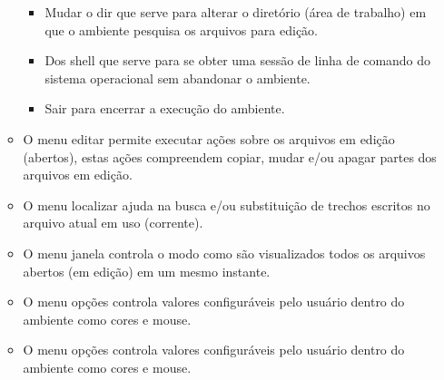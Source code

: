 \begin{enumerate}
\begin{itemize}
\begin{itemize}

  \item Mudar o dir que serve para alterar o diretório (área de trabalho) em que
  o ambiente pesquisa os arquivos para edição.

  \item Dos shell que serve para se obter uma sessão de linha de comando do
  sistema operacional sem abandonar o ambiente.

  \item Sair para encerrar a execução do ambiente.

\end{itemize}

  \item O menu editar permite executar ações sobre os arquivos em edição
  (abertos), estas ações compreendem copiar, mudar e/ou apagar partes dos
  arquivos em edição.

  \item O menu localizar ajuda na busca e/ou substituição de trechos escritos no
  arquivo atual em uso (corrente).

  \item O menu janela controla o modo como são visualizados todos os arquivos
  abertos (em edição) em um mesmo instante.

  \item O menu opções controla valores configuráveis pelo usuário dentro do
  ambiente como cores e mouse.

  \item O menu opções controla valores configuráveis pelo usuário dentro do
  ambiente como cores e mouse.


\end{itemize}
\end{enumerate}
